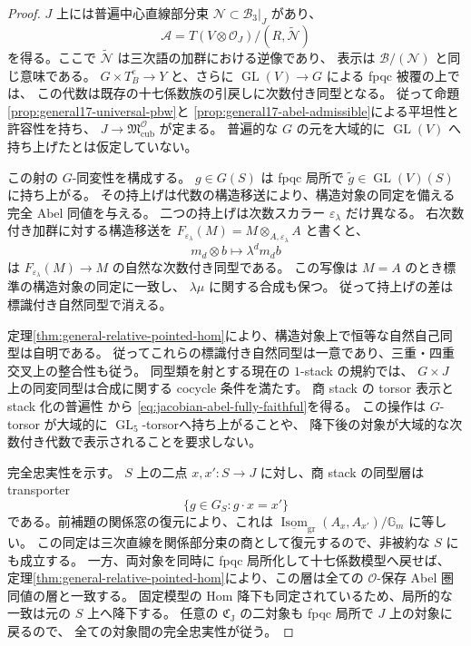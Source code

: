\begin{proof}
$J$ 上には普遍中心直線部分束
$\mathcal N\subset\mathcal B_3|_J$ があり、
\[
 \mathcal A=T(V\otimes\mathcal O_J)/(R,\widetilde{\mathcal N})
\]
を得る。ここで $\widetilde{\mathcal N}$ は三次語の加群における逆像であり、
表示は $\mathcal B/(\mathcal N)$ と同じ意味である。
$G\times T_B^e\to Y$ と、さらに
$\operatorname{GL}(V)\to G$ による fpqc 被覆の上では、
この代数は既存の十七係数族の引戻しに次数付き同型となる。
従って命題\ref{prop:general17-universal-pbw}と
\ref{prop:general17-abel-admissible}による平坦性と許容性を持ち、
$J\to\mathfrak M^{\mathcal O}_{\mathrm{cub}}$ が定まる。
普遍的な $G$ の元を大域的に $\operatorname{GL}(V)$ へ持ち上げたとは仮定していない。

この射の $G$-同変性を構成する。
$g\in G(S)$ は fpqc 局所で $\widetilde g\in\operatorname{GL}(V)(S)$ に持ち上がる。
その持上げは代数の構造移送により、構造対象の同定を備える完全 Abel 同値を与える。
二つの持上げは次数スカラー $\varepsilon_\lambda$ だけ異なる。
右次数付き加群に対する構造移送を
$F_{\varepsilon_\lambda}(M)=M\otimes_{A,\varepsilon_\lambda}A$ と書くと、
\[
 m_d\otimes b\longmapsto\lambda^d m_db
\]
は $F_{\varepsilon_\lambda}(M)\to M$ の自然な次数付き同型である。
この写像は $M=A$ のとき標準の構造対象の同定に一致し、
$\lambda\mu$ に関する合成も保つ。
従って持上げの差は標識付き自然同型で消える。

定理\ref{thm:general-relative-pointed-hom}により、構造対象上で恒等な自然自己同型は自明である。
従ってこれらの標識付き自然同型は一意であり、三重・四重交叉上の整合性も従う。
同型類を射とする現在の $1$-stack の規約では、
$G\times J$ 上の同変同型は合成に関する cocycle 条件を満たす。
商 stack の torsor 表示と stack 化の普遍性
\cite[Section~95.15]{StacksAlgebraicChart}から
\eqref{eq:jacobian-abel-fully-faithful}を得る。
この操作は $G$-torsor が大域的に $\operatorname{GL}_5$-torsorへ持ち上がることや、
降下後の対象が大域的な次数付き代数で表示されることを要求しない。

完全忠実性を示す。
$S$ 上の二点 $x,x':S\to J$ に対し、商 stack の同型層は transporter
\[
 \{g\in G_S:g\cdot x=x'\}
\]
である。前補題の関係窓の復元により、これは
$\underline{\operatorname{Isom}}_{\mathrm{gr}}(A_x,A_{x'})/\mathbb G_m$ に等しい。
この同定は三次直線を関係部分束の商として復元するので、非被約な $S$ にも成立する。
一方、両対象を同時に fpqc 局所化して十七係数模型へ戻せば、
定理\ref{thm:general-relative-pointed-hom}により、この層は全ての
$\mathcal O$-保存 Abel 圏同値の層と一致する。
固定模型の Hom 降下も同定されているため、局所的な一致は元の $S$ 上へ降下する。
任意の $\mathfrak C_{\mathrm J}$ の二対象も fpqc 局所で $J$ 上の対象に戻るので、
全ての対象間の完全忠実性が従う。


\end{proof}
